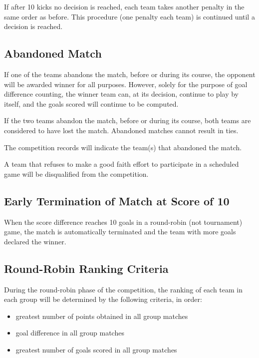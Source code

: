 If after 10 kicks no decision is reached, each team takes another penalty in the same order as before.
This procedure (one penalty each team) is continued until a decision is reached.

\subsection{Abandoned Match}
If one of the teams abandons the match, before or during its course, the opponent will be awarded winner for all purposes.
However, solely for the purpose of goal difference counting, the winner team can, at its decision, continue to play by itself, and the goals scored will continue to be computed.

If the two teams abandon the match, before or during its course, both teams are considered to have lost the match.
Abandoned matches cannot result in ties.

The competition records will indicate the team(s) that abandoned the match.

A team that refuses to make a good faith effort to participate in a
scheduled game will be disqualified from the competition.

\subsection{Early Termination of Match at Score of 10}

When the score difference reaches 10 goals in a round-robin (not tournament) game, the match is automatically terminated and the team with more goals declared the winner.

\subsection{Round-Robin Ranking Criteria}

During the round-robin phase of the competition, the ranking of each team in each group will be determined by the following criteria, in order:
\begin{itemize}
\item greatest number of points obtained in all group matches
\item goal difference in all group matches
\item greatest number of goals scored in all group matches
\end{itemize}

